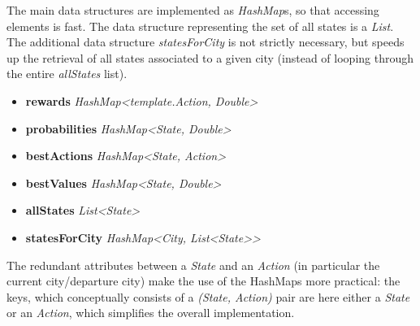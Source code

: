 \documentclass[11pt]{article}
\begin{document}
The main data structures are implemented as \textit{HashMap}s, so that accessing elements is fast. The data structure representing the set of all states is a \textit{List}. The additional data structure \textit{statesForCity} is not strictly necessary, but speeds up the retrieval of all states associated to a given city (instead of looping through the entire \textit{allStates} list).
\begin{itemize}
\itemsep 1mm 
\item[]\textbf{rewards}  \textit{HashMap\textless template.Action, Double\textgreater}
\item[]\textbf{probabilities} \textit{HashMap\textless State, Double\textgreater}
\item[]\textbf{bestActions} \textit{HashMap\textless State, Action\textgreater}
\item[]\textbf{bestValues} \textit{HashMap\textless State, Double\textgreater}
\item[]\textbf{allStates} \textit{List\textless State\textgreater}
\item[]\textbf{statesForCity} \textit{HashMap\textless City, List\textless State\textgreater \textgreater}
\end{itemize}

The redundant attributes between a \textit{State} and an \textit{Action} (in particular the current city/departure city) make the use of the HashMaps more practical: the keys, which conceptually consists of a \textit{(State, Action)} pair are here either a \textit{State} or an \textit{Action}, which simplifies the overall implementation.
\end{document}
